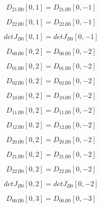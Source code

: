 \documentclass{article}
\begin{document}
\begin{dmath}{D_{21}{_{B0}}}[{0,1}] = {D_{21}{_{B0}}}[{0,-1}]\end{dmath}

\begin{dmath}{D_{22}{_{B0}}}[{0,1}] = {D_{22}{_{B0}}}[{0,-1}]\end{dmath}

\begin{dmath}{detJ{_{B0}}}[{0,1}] = {detJ{_{B0}}}[{0,-1}]\end{dmath}

\begin{dmath}{D_{00}{_{B0}}}[{0,2}] = {D_{00}{_{B0}}}[{0,-2}]\end{dmath}

\begin{dmath}{D_{01}{_{B0}}}[{0,2}] = {D_{01}{_{B0}}}[{0,-2}]\end{dmath}

\begin{dmath}{D_{02}{_{B0}}}[{0,2}] = {D_{02}{_{B0}}}[{0,-2}]\end{dmath}

\begin{dmath}{D_{10}{_{B0}}}[{0,2}] = {D_{10}{_{B0}}}[{0,-2}]\end{dmath}

\begin{dmath}{D_{11}{_{B0}}}[{0,2}] = {D_{11}{_{B0}}}[{0,-2}]\end{dmath}

\begin{dmath}{D_{12}{_{B0}}}[{0,2}] = {D_{12}{_{B0}}}[{0,-2}]\end{dmath}

\begin{dmath}{D_{20}{_{B0}}}[{0,2}] = {D_{20}{_{B0}}}[{0,-2}]\end{dmath}

\begin{dmath}{D_{21}{_{B0}}}[{0,2}] = {D_{21}{_{B0}}}[{0,-2}]\end{dmath}

\begin{dmath}{D_{22}{_{B0}}}[{0,2}] = {D_{22}{_{B0}}}[{0,-2}]\end{dmath}

\begin{dmath}{detJ{_{B0}}}[{0,2}] = {detJ{_{B0}}}[{0,-2}]\end{dmath}

\begin{dmath}{D_{00}{_{B0}}}[{0,3}] = {D_{00}{_{B0}}}[{0,-3}]\end{dmath}
\end{document}
